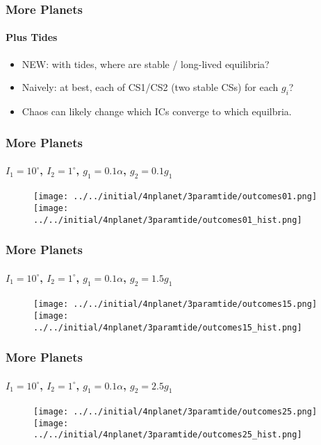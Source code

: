 \documentclass[dvipsnames]{beamer}
\begin{document}
\begin{frame}
    \frametitle{More Planets}
    \framesubtitle{Plus Tides}

    \begin{itemize}
        \item NEW\@: with tides, where are stable / long-lived equilibria?

        \item Naively: at best, each of CS1/CS2 (two stable CSs) for
            each $g_i$?

        \item Chaos can likely change which ICs converge to which equilbria.
    \end{itemize}
\end{frame}

\begin{frame}
    \frametitle{More Planets}
    \framesubtitle{$I_1 = 10^\circ$, $I_2 = 1^\circ$, $g_1 = 0.1 \alpha$,
        $g_2 = 0.1g_1$}

    \begin{figure}
        \centering
        \texttt{[image: ../../initial/4nplanet/3paramtide/outcomes01.png]}
        \texttt{[image: ../../initial/4nplanet/3paramtide/outcomes01\_hist.png]}
    \end{figure}
\end{frame}

\begin{frame}
    \frametitle{More Planets}
    \framesubtitle{$I_1 = 10^\circ$, $I_2 = 1^\circ$, $g_1 = 0.1 \alpha$,
        $g_2 = 1.5g_1$}

    \begin{figure}
        \centering
        \texttt{[image: ../../initial/4nplanet/3paramtide/outcomes15.png]}
        \texttt{[image: ../../initial/4nplanet/3paramtide/outcomes15\_hist.png]}
    \end{figure}
\end{frame}

\begin{frame}
    \frametitle{More Planets}
    \framesubtitle{$I_1 = 10^\circ$, $I_2 = 1^\circ$, $g_1 = 0.1 \alpha$,
        $g_2 = 2.5g_1$}

    \begin{figure}
        \centering
        \texttt{[image: ../../initial/4nplanet/3paramtide/outcomes25.png]}
        \texttt{[image: ../../initial/4nplanet/3paramtide/outcomes25\_hist.png]}
    \end{figure}
\end{frame}
\end{document}
